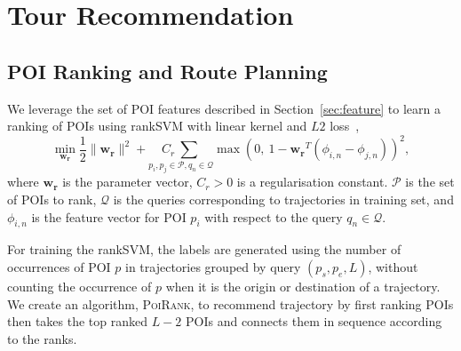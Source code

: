 \section{Tour Recommendation}
\label{sec:recommendation}


\subsection{POI Ranking and Route Planning}
\label{sec:rankplan}

We leverage the set of POI features described in Section~\ref{sec:feature}
to learn a ranking of POIs using rankSVM with linear kernel and $L2$ loss~\cite{lranksvm},
\begin{equation*}
\min_{\mathbf{w_r}} \frac{1}{2} 
                     \|\mathbf{w_r}\|^2 + 
                    \underset{p_i, p_j \in \mathcal{P}, q_n \in \mathcal{Q}}{C_r ~\sum}
                    \max \left( 0,~ 1 - \mathbf{w_r}^T (\phi_{i,n} - \phi_{j,n}) \right)^2,
\end{equation*}
where $\mathbf{w_r}$ is the parameter vector,
$C_r > 0$ is a regularisation constant.
$\mathcal{P}$ is the set of POIs to rank,
$\mathcal{Q}$ is the queries corresponding to trajectories in training set,
and $\phi_{i,n}$ is the feature vector for POI $p_i$ with respect to the query $q_n \in \mathcal{Q}$.

For training the rankSVM, the labels are generated using the number of occurrences of
POI $p$ in trajectories grouped by query $(p_s, p_e, L)$,
without counting the occurrence of $p$ when it is the origin or destination of a trajectory.
We create an algorithm, \textsc{PoiRank}, to recommend trajectory by first ranking POIs 
then takes the top ranked $L-2$ POIs and connects them in sequence according to the ranks.




